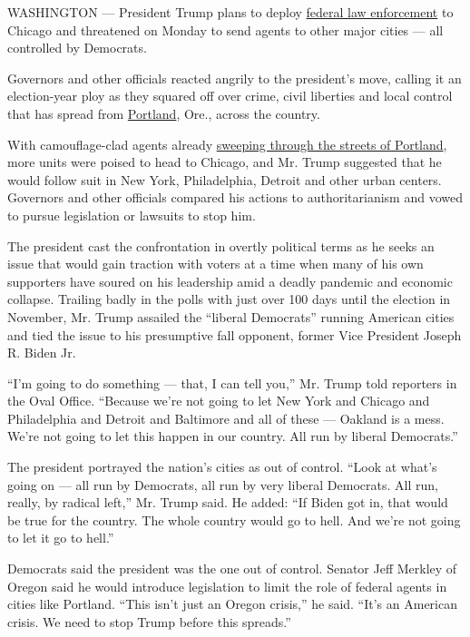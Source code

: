 WASHINGTON --- President Trump plans to deploy
\href{https://www.nytimes3xbfgragh.onion/2020/07/30/nyregion/nypd-protester-van.html}{federal
law enforcement} to Chicago and threatened on Monday to send agents to
other major cities --- all controlled by Democrats.

Governors and other officials reacted angrily to the president's move,
calling it an election-year ploy as they squared off over crime, civil
liberties and local control that has spread from
\href{https://www.nytimes3xbfgragh.onion/2020/07/20/us/portland-protests-navy-christopher-david.html}{Portland},
Ore., across the country.

With camouflage-clad agents already
\href{https://www.nytimes3xbfgragh.onion/2020/07/18/us/portland-protests.html}{sweeping
through the streets of Portland}, more units were poised to head to
Chicago, and Mr. Trump suggested that he would follow suit in New York,
Philadelphia, Detroit and other urban centers. Governors and other
officials compared his actions to authoritarianism and vowed to pursue
legislation or lawsuits to stop him.

The president cast the confrontation in overtly political terms as he
seeks an issue that would gain traction with voters at a time when many
of his own supporters have soured on his leadership amid a deadly
pandemic and economic collapse. Trailing badly in the polls with just
over 100 days until the election in November, Mr. Trump assailed the
``liberal Democrats'' running American cities and tied the issue to his
presumptive fall opponent, former Vice President Joseph R. Biden Jr.

``I'm going to do something --- that, I can tell you,'' Mr. Trump told
reporters in the Oval Office. ``Because we're not going to let New York
and Chicago and Philadelphia and Detroit and Baltimore and all of these
--- Oakland is a mess. We're not going to let this happen in our
country. All run by liberal Democrats.''

The president portrayed the nation's cities as out of control. ``Look at
what's going on --- all run by Democrats, all run by very liberal
Democrats. All run, really, by radical left,'' Mr. Trump said. He added:
``If Biden got in, that would be true for the country. The whole country
would go to hell. And we're not going to let it go to hell.''

Democrats said the president was the one out of control. Senator Jeff
Merkley of Oregon said he would introduce legislation to limit the role
of federal agents in cities like Portland. ``This isn't just an Oregon
crisis,'' he said. ``It's an American crisis. We need to stop Trump
before this spreads.''

